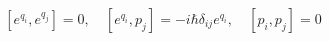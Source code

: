 \begin{equation}
\left[e^{q_i} , e^{q_j} \right] =0,\quad 
\left[ e^{q_i} , p_j\right] =
 -i\hbar \delta_{ij}e^{q_i},\quad
 \left[ p_i, p_j \right] = 0
 \label{canquant} 
\end{equation}

